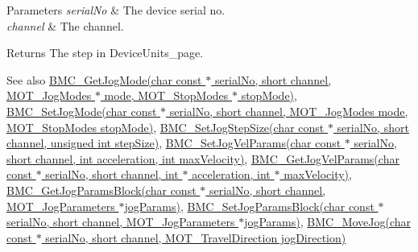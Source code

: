\begin{DoxyParams}{Parameters}
{\em serial\+No} & The device serial no. \\
\hline
{\em channel} & The channel. \\
\hline
\end{DoxyParams}
\begin{DoxyReturn}{Returns}
The step in Device\+Units\+\_\+page. 
\end{DoxyReturn}
\begin{DoxySeeAlso}{See also}
\hyperlink{group___benchtop_brushless_motor_ga1535adbd349d34e18cd27b40addf4d48}{B\+M\+C\+\_\+\+Get\+Jog\+Mode(char const $\ast$ serial\+No, short channel, M\+O\+T\+\_\+\+Jog\+Modes $\ast$ mode, M\+O\+T\+\_\+\+Stop\+Modes $\ast$ stop\+Mode)}, \hyperlink{group___benchtop_brushless_motor_gadca433900a96ff9226094e160df4225a}{B\+M\+C\+\_\+\+Set\+Jog\+Mode(char const $\ast$ serial\+No, short channel, M\+O\+T\+\_\+\+Jog\+Modes mode, M\+O\+T\+\_\+\+Stop\+Modes stop\+Mode)}, \hyperlink{group___benchtop_brushless_motor_ga4b3c5df621f32edb5e0026ff5586a797}{B\+M\+C\+\_\+\+Set\+Jog\+Step\+Size(char const $\ast$ serial\+No, short channel, unsigned int step\+Size)}, \hyperlink{group___benchtop_brushless_motor_gad0826555a6754fde004766d0cd54a320}{B\+M\+C\+\_\+\+Set\+Jog\+Vel\+Params(char const $\ast$ serial\+No, short channel, int acceleration, int max\+Velocity)}, \hyperlink{group___benchtop_brushless_motor_gadb923cdfd0f8d4102876f50b3014a766}{B\+M\+C\+\_\+\+Get\+Jog\+Vel\+Params(char const $\ast$ serial\+No, short channel, int $\ast$ acceleration, int $\ast$ max\+Velocity)}, \hyperlink{group___benchtop_brushless_motor_ga66c31c0bbc6ad56e358bb13b33471e53}{B\+M\+C\+\_\+\+Get\+Jog\+Params\+Block(char const $\ast$ serial\+No, short channel, M\+O\+T\+\_\+\+Jog\+Parameters $\ast$jog\+Params)}, \hyperlink{group___benchtop_brushless_motor_ga55965f81591974e3be7ddcee8e47875d}{B\+M\+C\+\_\+\+Set\+Jog\+Params\+Block(char const $\ast$ serial\+No, short channel, M\+O\+T\+\_\+\+Jog\+Parameters $\ast$jog\+Params)}, \hyperlink{group___benchtop_brushless_motor_ga269127abccbedb0d5cfcba6c1f3a2dd9}{B\+M\+C\+\_\+\+Move\+Jog(char const $\ast$ serial\+No, short channel, M\+O\+T\+\_\+\+Travel\+Direction jog\+Direction)}


\end{DoxySeeAlso}

\begin{DoxyCodeInclude}
\end{DoxyCodeInclude}
